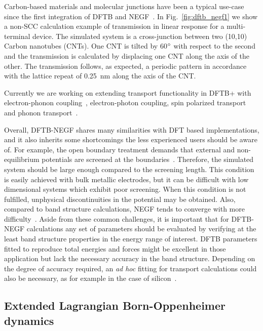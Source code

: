 \documentclass[reprint,onecolumn,superscriptaddress]{revtex4-1}
\newcommand{\dftbp}{DFTB+}
\begin{document}
Carbon-based materials and molecular junctions have been a typical use-case
since the first integration of DFTB and NEGF~\cite{reimers2007, latessa2005,
  penazzi2013}. In Fig.~\ref{fig:dftb_negf1} we show a non-SCC calculation
example of transmission in linear response for a multi-terminal device. The
simulated system is a cross-junction between two (10,10) Carbon nanotubes
(CNTs). One CNT is tilted by 60$\degree$ with respect to the second and the
transmission is calculated by displacing one CNT along the axis of the other. The transmission follows, as expected, a periodic pattern in accordance with
the lattice repeat of 0.25~nm along the axis of the CNT.

Currently we are working on extending transport functionality in \dftbp{} with
electron-phonon coupling~\cite{pecchia2004b, pecchia2007, penazzi2016,
  gagliardi2008}, electron-photon coupling, spin polarized transport and phonon
transport~\cite{medrano15b, medrano16, Martinez19, MedranoRev}.

Overall, DFTB-NEGF shares many similarities with DFT based implementations, and
it also inherits some shortcomings the less experienced users should be aware
of. For example, the open boundary treatment demands that external and
non-equilibrium potentials are screened at the boundaries~\cite{haug2008}.
Therefore, the simulated system should be large enough compared to the screening
length.  This condition is easily achieved with bulk metallic electrodes, but it
can be difficult with low dimensional systems which exhibit poor screening. When
this condition is not fulfilled, unphysical discontinuities in the potential may
be obtained. Also, compared to band structure calculations, NEGF tends to
converge with more difficulty~\cite{ozaki2010}. Aside from these common
challenges, it is important that for DFTB-NEGF calculations any set of
parameters should be evaluated by verifying at the least band structure
properties in the energy range of interest. DFTB parameters fitted to reproduce
total energies and forces might be excellent in those application but lack the
necessary accuracy in the band structure. Depending on the degree of accuracy
required, an {\it ad hoc} fitting for transport calculations could also be
necessary, as for example in the case of silicon~\cite{markov2015b}.

\subsection{Extended Lagrangian Born-Oppenheimer dynamics}
\end{document}
